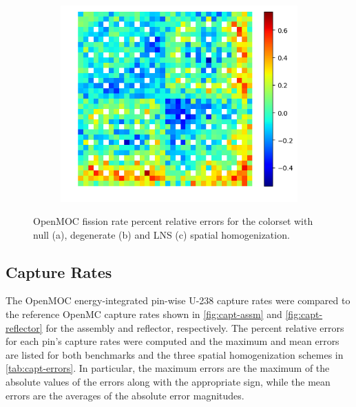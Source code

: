 \begin{figure}[H]
\begin{subfigure}{0.45\textwidth}
  \centering
  \includegraphics[width=\linewidth]{figures/reflector/fiss-lns-errors}
  \caption{}
  \label{fig:reflector-fiss-lns-error}
\end{subfigure}
\caption{OpenMOC fission rate percent relative errors for the colorset with null (a), degenerate (b) and LNS (c) spatial homogenization.}
\label{fig:reflector-fiss-errors}
\end{figure}


\subsection{Capture Rates}
\label{subsec:capt-rates}

The OpenMOC energy-integrated pin-wise U-238 capture rates were compared to the reference OpenMC capture rates shown in \autoref{fig:capt-assm} and \autoref{fig:capt-reflector} for the assembly and reflector, respectively. The percent relative errors for each pin's capture rates were computed and the maximum and mean errors are listed for both benchmarks and the three spatial homogenization schemes in \autoref{tab:capt-errors}. In particular, the maximum errors are the maximum of the absolute values of the errors along with the appropriate sign, while the mean errors are the averages of the absolute error magnitudes.

